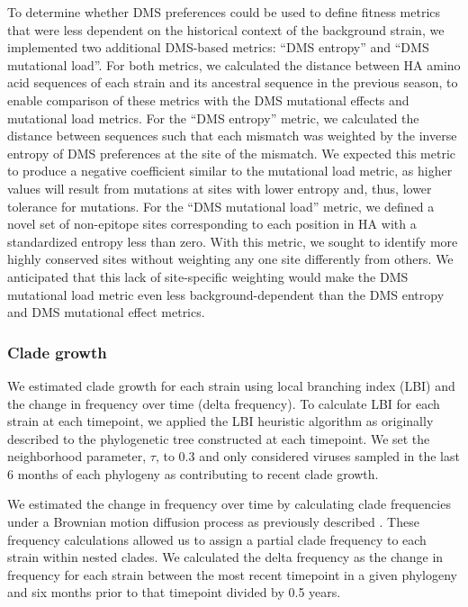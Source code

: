 To determine whether DMS preferences could be used to define fitness metrics that were less dependent on the historical context of the background strain, we implemented two additional DMS-based metrics: ``DMS entropy'' and ``DMS mutational load''.
For both metrics, we calculated the distance between HA amino acid sequences of each strain and its ancestral sequence in the previous season, to enable comparison of these metrics with the DMS mutational effects and mutational load metrics.
For the ``DMS entropy'' metric, we calculated the distance between sequences such that each mismatch was weighted by the inverse entropy of DMS preferences at the site of the mismatch.
We expected this metric to produce a negative coefficient similar to the mutational load metric, as higher values will result from mutations at sites with lower entropy and, thus, lower tolerance for mutations.
For the ``DMS mutational load'' metric, we defined a novel set of non-epitope sites corresponding to each position in HA with a standardized entropy less than zero.
With this metric, we sought to identify more highly conserved sites without weighting any one site differently from others.
We anticipated that this lack of site-specific weighting would make the DMS mutational load metric even less background-dependent than the DMS entropy and DMS mutational effect metrics.

\subsubsection*{Clade growth}

We estimated clade growth for each strain using local branching index (LBI) and the change in frequency over time (delta frequency).
To calculate LBI for each strain at each timepoint, we applied the LBI heuristic algorithm as originally described \cite{Neher:2014eu} to the phylogenetic tree constructed at each timepoint.
We set the neighborhood parameter, $\tau$, to 0.3 and only considered viruses sampled in the last 6 months of each phylogeny as contributing to recent clade growth.

We estimated the change in frequency over time by calculating clade frequencies under a Brownian motion diffusion process as previously described \cite{Lee2018}.
These frequency calculations allowed us to assign a partial clade frequency to each strain within nested clades.
We calculated the delta frequency as the change in frequency for each strain between the most recent timepoint in a given phylogeny and six months prior to that timepoint divided by 0.5 years.

